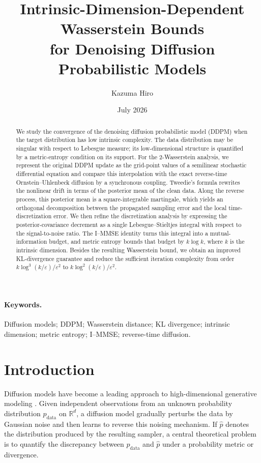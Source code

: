 \documentclass[11pt]{article}
\title{Intrinsic-Dimension-Dependent Wasserstein Bounds\\
for Denoising Diffusion Probabilistic Models}
\author{Kazuma Hiro}
\date{July 2026}
\theoremstyle{definition}
\newcommand{\R}{\mathbb{R}}
\newcommand{\pdata}{p_{\mathrm{data}}}
\begin{document}
\maketitle

\begin{abstract}
We study the convergence of the denoising diffusion probabilistic model (DDPM) when the target distribution has low intrinsic complexity. The data distribution may be singular with respect to Lebesgue measure; its low-dimensional structure is quantified by a metric-entropy condition on its support. For the 2-Wasserstein analysis, we represent the original DDPM update as the grid-point values of a semilinear stochastic differential equation and compare this interpolation with the exact reverse-time Ornstein--Uhlenbeck diffusion by a synchronous coupling. Tweedie's formula rewrites the nonlinear drift in terms of the posterior mean of the clean data. Along the reverse process, this posterior mean is a square-integrable martingale, which yields an orthogonal decomposition between the propagated sampling error and the local time-discretization error. We then refine the discretization analysis by expressing the posterior-covariance decrement as a single Lebesgue--Stieltjes integral with respect to the signal-to-noise ratio. The I--MMSE identity turns this integral into a mutual-information budget, and metric entropy bounds that budget by $k\log k$, where $k$ is the intrinsic dimension. Besides the resulting Wasserstein bound, we obtain an improved KL-divergence guarantee and reduce the sufficient iteration complexity from order $k\log^3(k/\varepsilon)/\varepsilon^2$ to $k\log^2(k/\varepsilon)/\varepsilon^2$.
\end{abstract}

\paragraph{Keywords.}
Diffusion models; DDPM; Wasserstein distance; KL divergence; intrinsic dimension; metric entropy; I--MMSE; reverse-time diffusion.

\section{Introduction}

Diffusion models have become a leading approach to high-dimensional
generative modeling \citep{ho2020ddpm,song2021score}. Given
independent observations from an unknown probability distribution
$\pdata$ on $\R^d$, a diffusion model gradually perturbs the data by
Gaussian noise and then learns to reverse this noising mechanism. If
$\hat p$ denotes the distribution produced by the resulting sampler,
a central theoretical problem is to quantify the discrepancy between
$\pdata$ and $\hat p$ under a probability metric or divergence.
\end{document}
